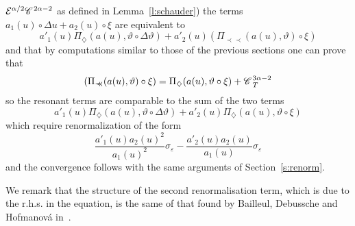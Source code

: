 \documentclass{amsart}
\newcommand{\precprec}{\prec\!\!\!\prec}
\theoremstyle{remark}
\theoremstyle{definition}
\newcommand{\CC}{\mathscr{C} \hspace{.1em}}
\begin{document}
$\mathcal{E}^{\alpha / 2} \CC^{2 \alpha - 2}$ as defined in
Lemma~\ref{l:schauder}) the terms $a_1 (u) \circ \Delta u + a_2 (u) \circ \xi$
are equivalent to
\[ a'_1 (u) \Pi_{\diamondsuit} (a (u), \vartheta \circ \Delta \vartheta) +
   a'_2 (u) (\Pi_{\precprec} (a (u), \vartheta) \circ \xi) \]
and that by computations similar to those of the previous sections one can
prove that
\[ (\Pi_{\precprec} (a (u), \vartheta) \circ \xi) = \Pi_{\diamondsuit} (a (u),
   \vartheta \circ \xi) + \CC^{3 \alpha - 2}_T \]
so the resonant terms are comparable to the sum of the two terms
\[ a'_1 (u) \Pi_{\diamondsuit} (a (u), \vartheta \circ \Delta \vartheta) +
   a'_2 (u) \Pi_{\diamondsuit} (a (u), \vartheta \circ \xi) \]
which require renormalization of the form
\begin{equation}
  \frac{a'_1 (u) a_2 (u)^2}{a_1 (u)^2} \sigma_{\varepsilon} - \frac{a'_2 (u)
  a_2 (u)}{a_1 (u)} \sigma_{\varepsilon} \label{eq:renorm-non-linear-rhs}
\end{equation}
and the convergence follows with the same arguments of Section~\ref{s:renorm}.

We remark that the structure of the second renormalisation term, which is due
to the r.h.s. in the equation, is the same of that found by Bailleul,
Debussche and Hofmanov{\'a} in~{\cite{hofmanova}}.
\end{document}
